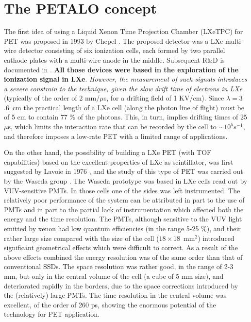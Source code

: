 
\section{The PETALO concept}
\label{sec.petalo}

The first idea of using a Liquid Xenon Time Projection Chamber (LXeTPC) for PET was proposed in 1993 by Chepel \cite{chepel02}. The proposed detector was a LXe multi-wire detector consisting of six ionization cells, each formed by two parallel cathode plates with a multi-wire anode in the middle. 
Subsequent R\&D is documented in \cite{chepel94,chepel95,lopes95,chepel97,crespo98,chepel99,crespo00}. {\bf All those devices were based in the exploration of the ionization signal in LXe}. {\em However, the measurement of such signals introduces a severe constrain to the technique, given the slow drift time of electrons in LXe} (typically of the order of 2 mm/$\mu$s, for a drifting field of 1 KV/cm). Since $\lambda = 3$.6~cm the practical length of a LXe cell (along the photon line of flight) must be of 5 cm to contain 77 \% of the photons. This, in turn, implies drifting times of 25 $\mu$s, which limits the interaction rate that can be recorded by the cell to $\sim10^5 s^{-1}$, and therefore imposes a low-rate PET with a limited range of applications. 

On the other hand, the possibility of building a LXe PET (with TOF capabilities) based on the excellent properties of LXe as scintillator, was first suggested by Lavoie in 1976 \cite{lavoie76} , and the study of this type of PET was carried out by the Waseda group \cite{doke06,nishikido05,nishikido04}. The Waseda prototype was based in LXe cells read out by VUV-sensitive PMTs. In those cells one of the sides was left instrumented. The relatively poor performance of the system can be attributed in part to the use of PMTs and in part to the partial lack of instrumentation which affected both the energy and the time resolution. The PMTs, although sensitive to the VUV light emitted by xenon had low quantum efficiencies (in the range 5-25 \%), and their rather large size compared with the size of the cell ($18\times 18$~mm$^2$) introduced significant geometrical effects which were difficult to correct. As a result of the above effects combined the energy resolution was of the same order than that of conventional SSDs. The space resolution was rather good, in the range of 2-3 mm, but only in the central volume of the cell (a cube of 5 mm size), and deteriorated rapidly in the borders, due to the space corrections introduced by the (relatively) large PMTs. The time resolution in the central volume was excellent, of the order of 260 ps, showing the enormous potential of the technology for PET application.

